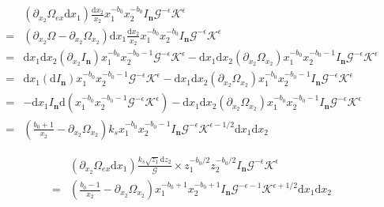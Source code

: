\documentclass[a4paper,12pt]{article}
\newcommand{\n}{\nonumber}
\def\di{{\mathrm{d}}}
\def\ep{\epsilon}
\newcommand{\mG}{\mathcal{G}}
\newcommand{\mK}{\mathcal{K}}
\begin{document}
\begin{align}
&(\partial_{x_2} \Omega_{ex} \di x_1)\frac{\di x_2}{x_2} x_1^{-b_0} x_2^{-b_0} I_{\bm{n}} \mG^{-\ep} \mK^{\ep} \n\\
=&(\partial_{x_2} \Omega- \partial_{x_2} \Omega_{x_2}) \di x_1\frac{\di x_2}{x_2} x_1^{-b_0} x_2^{-b_0} I_{\bm{n}} \mG^{-\ep}  \mK^{\ep} \n\\
=&\di x_1 \di x_2 (\partial_{x_2}I_{\bm{n}}) x_1^{-b_0} x_2^{-b_0-1}\mG^{-\ep}  \mK^{\ep}  - \di x_1 \di x_2 (\partial_{x_2} \Omega_{x_2}) x_1^{-b_0} x_2^{-b_0-1}I_{\bm{n}}\mG^{-\ep}  \mK^{\ep} \n\\
=& \di x_1 (\di I_{\bm{n}}) x_1^{-b_0} x_2^{-b_0-1}\mG^{-\ep}  \mK^{\ep}  - \di x_1 \di x_2 (\partial_{x_2} \Omega_{x_2}) x_1^{-b_0} x_2^{-b_0-1}I_{\bm{n}}\mG^{-\ep}  \mK^{\ep}  \n \\
=& - \di x_1 I_{\bm{n}} \di  \left( x_1^{-b_0} x_2^{-b_0-1} \mG^{-\ep}  \mK^{\ep} \right) - \di x_1 \di x_2 (\partial_{x_2} \Omega_{x_2}) x_1^{-b_0} x_2^{-b_0-1} I_{\bm{n}} \mG^{-\ep}  \mK^{\ep} \n\\
=& \left(\frac{b_0+1}{x_2} - \partial_{x_2} \Omega_{x_2}  \right) k_s    x_1^{-b_0} x_2^{-b_0-1} I_{\bm{n}} \mG^{-\ep}  \mK^{\ep-1/2} \di x_1 \di x_2
\end{align}

\begin{align}
&(\partial_{x_2} \Omega_{ex} \di x_1) \frac{ k_s\sqrt{z_1} \di z_2}{ \mG } \times z_1^{-b_0/2} z_2^{-b_0/2} I_{\bm{n}} \mG^{-\ep} \mK^\ep  \n \\
=& \left( \frac{b_0-1}{x_2} - \partial_{x_2} \Omega_{x_2}  \right)     x_1^{-b_0+1} x_2^{-b_0+1} I_{\bm{n}} \mG^{-\ep-1}  \mK^{\ep+1/2} \di x_1 \di x_2
\end{align}



\newpage
 

\end{document}
